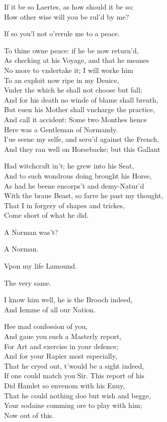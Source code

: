 \documentclass[a5paper,DIV=calc,11pt]{scrbook}
\begin{document}
\begin{drama*}
    \kingspeaks If it be so Laertes, as how should it be so:\\
    How other wise will you be rul'd by me?
    
    \laerspeaks If so you'l not o'rerule me to a peace.
    
    \kingspeaks To thine owne peace: if he be now return'd,\\
    As checking at his Voyage, and that he meanes\\
    No more to vndertake it; I will worke him\\
    To an exploit now ripe in my Deuice,\\
    Vnder the which he shall not choose but fall;\\
    And for his death no winde of blame shall breath,\\
    But euen his Mother shall vncharge the practice,\\
    And call it accident: Some two Monthes hence\\
    Here was a Gentleman of Normandy.\\
    I'ue seene my selfe, and seru'd against the French,\\
    And they ran well on Horsebacke; but this Gallant
    
    Had witchcraft in't; he grew into his Seat,\\
    And to such wondrous doing brought his Horse,\\
    As had he beene encorps't and demy-Natur'd\\
    With the braue Beast, so farre he past my thought,\\
    That I in forgery of shapes and trickes,\\
    Come short of what he did.
    
    \laerspeaks A Norman was't?
    
    \kingspeaks A Norman.
    
    \laerspeaks Vpon my life Lamound.
    
    \kingspeaks The very same.
    
    \laerspeaks I know him well, he is the Brooch indeed,\\
    And Iemme of all our Nation.
    
    \kingspeaks Hee mad confession of you,\\
    And gaue you such a Masterly report,\\
    For Art and exercise in your defence;\\
    And for your Rapier most especially,\\
    That he cryed out, t'would be a sight indeed,\\
    If one could match you Sir. This report of his\\
    Did Hamlet so envenom with his Enuy,\\
    That he could nothing doe but wish and begge,\\
    Your sodaine comming ore to play with him;\\
    Now out of this.
    

\end{drama*}
\end{document}
